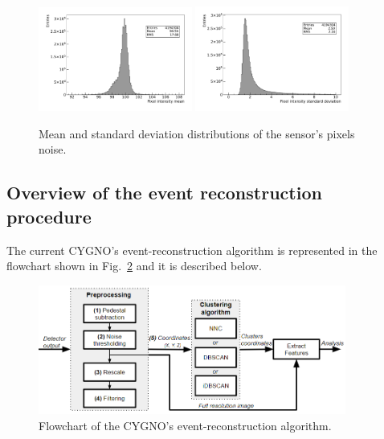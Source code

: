 \documentclass[a4paper,11pt]{article}
\begin{document}
\begin{figure}[ht]
\centering
\includegraphics[width=0.45\textwidth]{Mean_2155.pdf}
\includegraphics[width=0.45\textwidth]{Std_2155.pdf}
\caption{Mean and standard deviation distributions of the sensor's pixels noise.}
\label{fig:sensor_noise}
\end{figure}

\subsection{Overview of the event reconstruction procedure}

The current CYGNO's event-reconstruction algorithm is represented in the flowchart shown in Fig.~\ref{fig_algo} and it is described below.

\begin{figure}[ht]
\centering
\includegraphics[width=0.9\textwidth]{fluxgram_algorithm.PNG}
\caption{Flowchart of the CYGNO's event-reconstruction algorithm.}
\label{fig_algo}
\end{figure}
\end{document}
